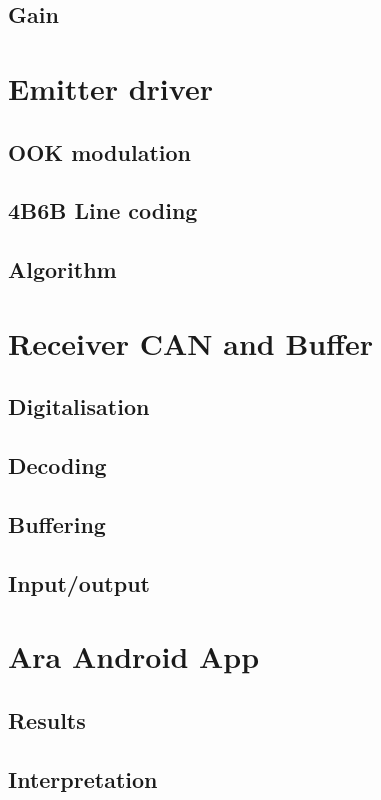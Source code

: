 \subsection{Gain}


\section{Emitter driver}

\subsection{OOK modulation}
\subsection{4B6B Line coding}
\subsection{Algorithm}



\section{Receiver CAN and Buffer}

\subsection{Digitalisation}
\subsection{Decoding}
\subsection{Buffering}
\subsection{Input/output}


\section{Ara Android App}

\subsection{Results}
\subsection{Interpretation}